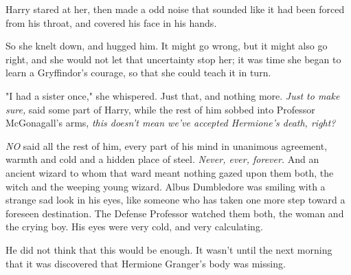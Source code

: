 Harry stared at her, then made a odd noise that sounded like it had been forced 
from his throat, and covered his face in his hands.

So she knelt down, and hugged him. It might go wrong, but it might also go 
right, and she would not let that uncertainty stop her; it was time she began 
to learn a Gryffindor's courage, so that she could teach it in turn.

"I had a sister once," she whispered. Just that, and nothing more.
\sbreak
\emph{Just to make sure,} said some part of Harry, while the rest of him sobbed 
into Professor McGonagall's arms, \emph{this doesn't mean we've accepted 
Hermione's death, right?}

\emph{NO} said all the rest of him, every part of his mind in unanimous 
agreement, warmth and cold and a hidden place of steel. \emph{Never, ever, 
forever.}
\sbreak
And an ancient wizard to whom that ward meant nothing gazed upon them both, the 
witch and the weeping young wizard. Albus Dumbledore was smiling with a strange 
sad look in his eyes, like someone who has taken one more step toward a 
foreseen destination.
\sbreak
The Defense Professor watched them both, the woman and the crying boy. His eyes 
were very cold, and very calculating.

He did not think that this would be enough.
\sbreak
It wasn't until the next morning that it was discovered that Hermione Granger's 
body was missing.